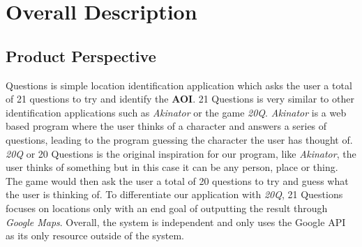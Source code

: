 \documentclass[titlepage]{article}
\begin{document}
		
		
		\section{Overall Description}
		\label{sec:overall_description}
		
		\subsection{Product Perspective}
		\label{sub:product_perspective}
			\indent {} Questions is simple location identification application which asks the user a total of 21 questions to try and identify the \textbf{AOI}. 21 Questions is very similar to other identification applications such as \textit{Akinator} or the game \textit{20Q}. \textit{Akinator} is a web based program where the user thinks of a character and answers a series of questions, leading to the program guessing the character the user has thought of. \textit{20Q} or 20 Questions is the original inspiration for our program, like \textit{Akinator}, the user thinks of something but in this case it can be any person, place or thing. The game would then ask the user a total of 20 questions to try and guess what the user is thinking of. To differentiate our application with \textit{20Q}, 21 Questions focuses on locations only with an end goal of outputting the result through \textit{Google Maps}. Overall, the system is independent and only uses the Google API as its only resource outside of the system.
		
\end{document}

